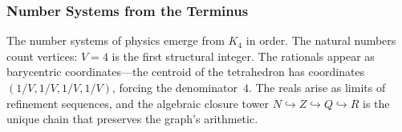 \documentclass[11pt,a4paper]{book}
\def\mathbb#1{#1}%
\begin{document}
\subsubsection*{Number Systems from the Terminus}

The number systems of physics emerge from $K_4$ in order.  The natural
numbers count vertices: $V = 4$ is the first structural integer.  The
rationals appear as barycentric coordinates---the centroid of the
tetrahedron has coordinates $(1/V, 1/V, 1/V, 1/V)$, forcing the
denominator~$4$.  The reals arise as limits of refinement sequences, and
the algebraic closure tower
$\mathbb{N} \hookrightarrow \mathbb{Z} \hookrightarrow \mathbb{Q}
\hookrightarrow \mathbb{R}$
is the unique chain that preserves the graph's arithmetic.
\end{document}
